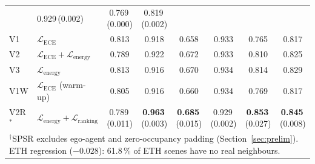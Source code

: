 \documentclass[journal]{IEEEtran}
\begin{document}
\begin{table}[tp]
\begin{tabular}{l l c c c c c c}
  & 0.929\,(0.002) & 0.769\,(0.000) & 0.819\,(0.002) \\
V1   & $\mathcal{L}_\mathrm{ECE}$
  & 0.813 & 0.918 & 0.658 & 0.933 & 0.765 & 0.817 \\
V2   & $\mathcal{L}_\mathrm{ECE}{+}\mathcal{L}_\mathrm{energy}$
  & 0.789 & 0.922 & 0.672 & 0.933 & 0.810 & 0.825 \\
V3   & $\mathcal{L}_\mathrm{energy}$
  & 0.813 & 0.916 & 0.670 & 0.934 & 0.814 & 0.829 \\
V1W  & $\mathcal{L}_\mathrm{ECE}$ (warm-up)
  & 0.805 & 0.916 & 0.660 & 0.934 & 0.769 & 0.817 \\
V2R$^*$ & $\mathcal{L}_\mathrm{energy}{+}\mathcal{L}_\mathrm{ranking}$
  & 0.789\,(0.011) & \textbf{0.963}\,(0.003)
  & \textbf{0.685}\,(0.015) & 0.929\,(0.002)
  & \textbf{0.853}\,(0.027) & \textbf{0.845}\,(0.008) \\
\bottomrule
\multicolumn{8}{l}{{\scriptsize $^\dagger$SPSR excludes ego-agent and zero-occupancy padding
  (Section~\ref{sec:prelim}). ETH regression ($-0.028$): 61.8\,\% of ETH scenes have no real neighbours.}} \\
\end{tabular}
\end{table}
\end{document}
